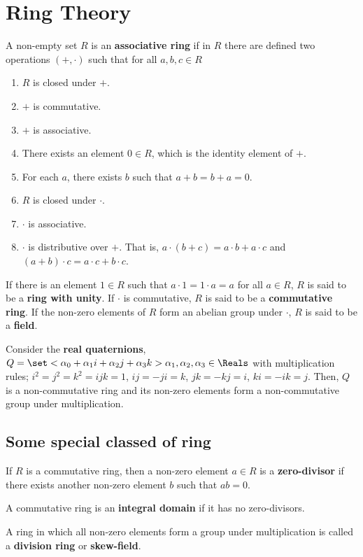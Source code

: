 \chapter{Ring Theory}
\begin{definition}
    A non-empty set \(R\) is an \textbf{associative ring} if in \(R\) there are defined two operations \((+, \cdot)\) such that for all \(a,b,c \in R\)
    \begin{enumerate}
        \item \(R\) is closed under \(+\).
        \item \(+\) is commutative.
        \item \(+\) is associative.
        \item There exists an element \(0 \in R\), which is the identity element of \(+\).
        \item For each \(a\), there exists \(b\) such that \(a + b = b + a = 0\).
        \item \(R\) is closed under \(\cdot\).
        \item \(\cdot\) is associative.
        \item \(\cdot\) is distributive over \(+\). That is, \(a\cdot(b+c) = a\cdot b + a \cdot c\)  and \((a + b) \cdot c = a \cdot c + b \cdot c\).
    \end{enumerate}
    If there is an element \(1 \in R\) such that \(a \cdot 1 = 1 \cdot a = a\) for all \(a \in R\), \(R\) is said to be a \textbf{ring with unity}. If \(\cdot\) is commutative, \(R\) is said to be a \textbf{commutative ring}. If the non-zero elements of \(R\) form an abelian group under \(\cdot\), \(R\) is said to be a \textbf{field}.
\end{definition}

\begin{example}
    Consider the \textbf{real quaternions}, \(Q = \set<\alpha_0 + \alpha_1 i + \alpha_2 j + \alpha_3 k>{\alpha_1,\alpha_2,\alpha_3 \in \Reals}\) with multiplication rules; \(i^2 = j^2 = k^2 = ijk = 1\), \(ij = -ji = k\), \(jk = -kj = i\), \(ki = -ik = j\). Then, \(Q\) is a non-commutative ring and its non-zero elements form a non-commutative group under multiplication.
\end{example}
\section{Some special classed of ring}
\begin{definition}
    If \(R\) is a commutative ring, then a non-zero element \(a \in R\) is a \textbf{zero-divisor} if there exists another non-zero element \(b\) such that \(ab = 0\).
\end{definition}
\begin{definition}
    A commutative ring is an \textbf{integral domain} if it has no zero-divisors.
\end{definition}
\begin{definition}
    A ring in which all non-zero elements form a group under multiplication is called a \textbf{division ring} or \textbf{skew-field}.
\end{definition}

